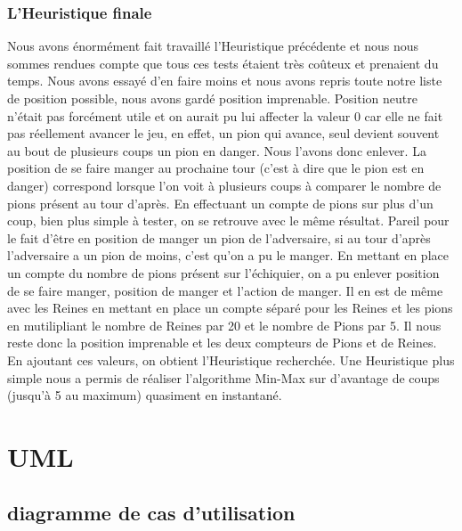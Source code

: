 \documentclass[12,french]{report}
\begin{document}
\subsection{L'Heuristique finale}
Nous avons énormément fait travaillé l'Heuristique précédente et nous nous sommes rendues compte que tous ces tests étaient très coûteux et prenaient du temps.
Nous avons essayé d'en faire moins et nous avons repris toute notre liste de position possible, nous avons gardé position imprenable. Position neutre n'était pas forcément utile et on aurait pu lui affecter la valeur 0 car elle ne fait pas réellement avancer le jeu, en effet, un pion qui avance, seul devient souvent au bout de plusieurs coups un pion en danger. Nous l'avons donc enlever. 
La position de se faire manger au prochaine tour (c'est à dire que le pion est en danger) correspond lorsque l'on voit à plusieurs coups à comparer le nombre de pions présent au tour d'après. En effectuant un compte de pions sur plus d'un coup, bien plus simple à tester, on se retrouve avec le même résultat. Pareil pour le fait d'être en position de manger un pion de l'adversaire, si au tour d'après l'adversaire a un pion de moins, c'est qu'on a pu le manger.
En mettant en place un compte du nombre de pions présent sur l'échiquier, on a pu enlever position de se faire manger, position de manger et l'action de manger. Il en est de même avec les Reines en mettant en place un compte séparé pour les Reines et les pions en mutilipliant le nombre de Reines par 20 et le nombre de Pions par 5. 
Il nous reste donc la position imprenable et les deux compteurs de Pions et de Reines. En ajoutant ces valeurs, on obtient l'Heuristique recherchée. Une Heuristique plus simple nous a permis de réaliser l'algorithme Min-Max sur d'avantage de coups (jusqu'à 5 au maximum) quasiment en instantané.



\chapter{UML}

\section{diagramme de cas d'utilisation}
\end{document}
